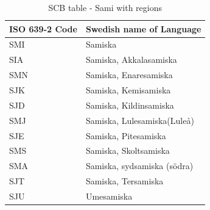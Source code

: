 \begin{table}[!htp]
    \caption{SCB table - Sami with regions}
    \label{tab:SCBsami}
    \begin{tabular}{L{3cm}|L{6.5cm}}
      \textbf{ISO 639-2 Code} &\textbf{Swedish name of Language}\\
      \hline
SMI &   Samiska\\
SIA &   Samiska, Akkalasamiska\\
SMN &   Samiska, Enaresamiska\\
SJK &   Samiska, Kemisamiska\\
SJD &   Samiska, Kildinsamiska\\
SMJ &   Samiska, Lulesamiska(Luleå)\\
SJE &   Samiska, Pitesamiska\\
SMS &   Samiska, Skoltsamiska\\
SMA &  Samiska, sydsamiska (södra)\\
SJT &  Samiska, Tersamiska\\
SJU &  Umesamiska\\
\end{tabular}
\end{table}
\clearpage
